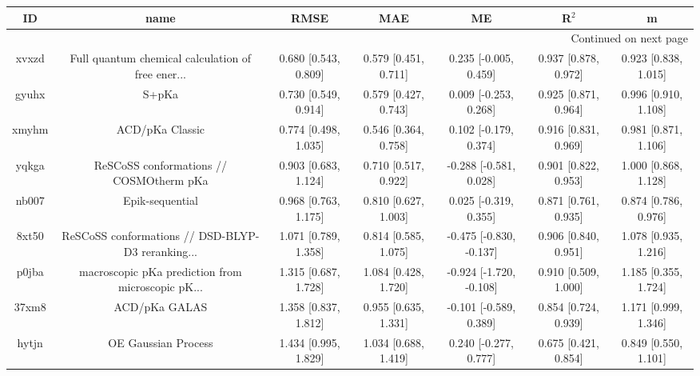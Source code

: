 \documentclass{article}
\begin{document}
\begin{center}
\begin{longtable}{|ccccccc|}
\toprule
    ID &                                               name &                  RMSE &                   MAE &                       ME &                 R$^2$ &                      m \\
\midrule
\endhead
\midrule
\multicolumn{7}{r}{{Continued on next page}} \\
\midrule
\endfoot

\bottomrule
\endlastfoot
 xvxzd &  Full quantum chemical calculation of free ener... &  0.680 [0.543, 0.809] &  0.579 [0.451, 0.711] &    0.235 [-0.005, 0.459] &  0.937 [0.878, 0.972] &   0.923 [0.838, 1.015] \\
 gyuhx &                                              S+pKa &  0.730 [0.549, 0.914] &  0.579 [0.427, 0.743] &    0.009 [-0.253, 0.268] &  0.925 [0.871, 0.964] &   0.996 [0.910, 1.108] \\
 xmyhm &                                    ACD/pKa Classic &  0.774 [0.498, 1.035] &  0.546 [0.364, 0.758] &    0.102 [-0.179, 0.374] &  0.916 [0.831, 0.969] &   0.981 [0.871, 1.106] \\
 yqkga &            ReSCoSS conformations // COSMOtherm pKa &  0.903 [0.683, 1.124] &  0.710 [0.517, 0.922] &   -0.288 [-0.581, 0.028] &  0.901 [0.822, 0.953] &   1.000 [0.868, 1.128] \\
 nb007 &                                    Epik-sequential &  0.968 [0.763, 1.175] &  0.810 [0.627, 1.003] &    0.025 [-0.319, 0.355] &  0.871 [0.761, 0.935] &   0.874 [0.786, 0.976] \\
 8xt50 &  ReSCoSS conformations // DSD-BLYP-D3 reranking... &  1.071 [0.789, 1.358] &  0.814 [0.585, 1.075] &  -0.475 [-0.830, -0.137] &  0.906 [0.840, 0.951] &   1.078 [0.935, 1.216] \\
 p0jba &  macroscopic pKa prediction from microscopic pK... &  1.315 [0.687, 1.728] &  1.084 [0.428, 1.720] &  -0.924 [-1.720, -0.108] &  0.910 [0.509, 1.000] &   1.185 [0.355, 1.724] \\
 37xm8 &                                      ACD/pKa GALAS &  1.358 [0.837, 1.812] &  0.955 [0.635, 1.331] &   -0.101 [-0.589, 0.389] &  0.854 [0.724, 0.939] &   1.171 [0.999, 1.346] \\
 hytjn &                                OE Gaussian Process &  1.434 [0.995, 1.829] &  1.034 [0.688, 1.419] &    0.240 [-0.277, 0.777] &  0.675 [0.421, 0.854] &   0.849 [0.550, 1.101] \\

\end{longtable}
\end{center}
\end{document}
